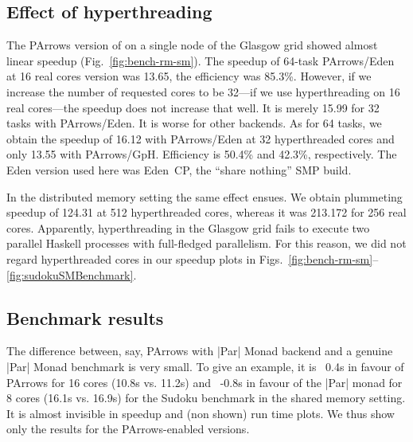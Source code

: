 \subsection{Effect of hyperthreading}

The PArrows version of \rmtest on a single node of the Glasgow grid
showed almost linear speedup (Fig.~\ref{fig:bench-rm-sm}). The speedup
of 64-task PArrows/Eden at 16 real cores version was 13.65, the
efficiency was 85.3\%.  However, if we increase the number of
requested cores to be 32---\ie if we use hyperthreading on 16 real
cores---the speedup does not increase that well. It is merely 15.99
for 32 tasks with PArrows/Eden. It is worse for other backends.  As
for 64 tasks, we obtain the speedup of 16.12 with PArrows/Eden at 32
hyperthreaded cores and only 13.55 with PArrows/GpH. Efficiency is 50.4\% and 42.3\%, respectively. The Eden
version used here was Eden~CP, the ``share nothing'' SMP build.

In the distributed memory setting the same effect ensues. We obtain
plummeting speedup of 124.31 at 512 hyperthreaded cores, whereas it was
213.172 for 256 real cores. Apparently, hyperthreading in the Glasgow
grid fails to execute two parallel Haskell processes with full-fledged
parallelism. For this reason, we did not regard hyperthreaded cores in
our speedup plots in Figs.~\ref{fig:bench-rm-sm}--\ref{fig:sudokuSMBenchmark}.




\subsection{Benchmark results}

The difference between, say, PArrows with |Par| Monad backend and a
genuine |Par|
Monad benchmark is very small. To give an example, it is ~0.4s in favour of PArrows for 16 cores (10.8s vs. 11.2s) and ~-0.8s in favour of the |Par| monad for 8 cores (16.1s vs. 16.9s) for
the Sudoku benchmark in the shared memory setting. It is almost invisible in speedup and
(non shown) run time plots. We thus show only the results for the
PArrows-enabled versions.

